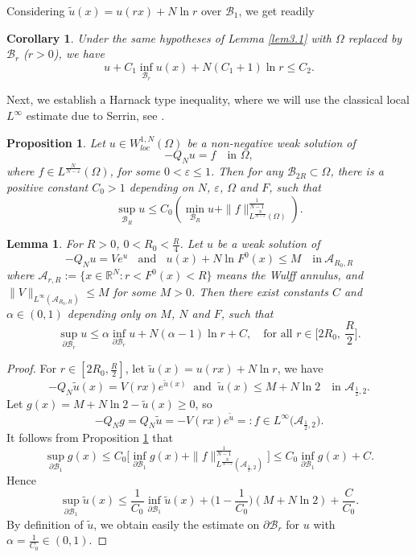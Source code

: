 \documentclass[11pt]{amsart}
\numberwithin{equation}{section}
\newtheorem{lem}[thm]{Lemma}
\newtheorem{cor}[thm]{Corollary}
\newtheorem{prop}[thm]{Proposition}
\newcommand{\A}{\mathcal{A}}
\newcommand{\B}{\mathcal{B}}
\def \p{\partial}
\begin{document}
\medskip
Considering $\widetilde{u}(x)=u(rx)+N\ln r$ over $\mathcal{B}_{1}$, we get readily
\begin{cor}\label{cor3.1}
Under the same hypotheses of Lemma \ref{lem3.1} with $\Omega$ replaced by $\mathcal{B}_r$ ($r > 0$), we have
$$u+C_{1}\inf_{\mathcal{B}_{r}}u(x)+N(C_{1}+1)\ln r\leq C_{2}.$$
\end{cor}

Next, we establish a Harnack type inequality, where we will use the classical local $L^{\infty}$ estimate due to Serrin, see \cite[Theorem 6]{S1964}.
\begin{prop}\label{pro2.2}
Let $u\in W^{1,N}_{loc}(\Omega)$ be a non-negative weak solution of
$$-Q_{N}u=f \quad\mbox{in }\Omega,$$
where $f\in L^{\frac{N}{N-\varepsilon}}(\Omega)$, for some $0<\varepsilon\leq1$. Then for any $\mathcal{B}_{2R}\subset\Omega$, there is a positive constant $C_0 > 1$ depending on $N$, $\varepsilon$, $\Omega$ and $F$, such that
$$
\sup_{\mathcal{B}_{R}}u\leq C_0\left(\min\limits_{\mathcal{B}_{R}}u+\| f\|^{\frac{1}{N-1}}_{L^{\frac{N}{N-\varepsilon}}(\Omega)}\right).
$$
\end{prop}
\begin{lem}\label{lem3.3}
For $R>0$, $0<R_{0}<\frac{R}{4}$. Let $u$ be a weak solution of
$$-Q_{N}u =Ve^{u} \;\; \mbox{ and  }\;\; u(x)+N\ln F^{0}(x) \leq M  \quad \mbox{in}~\A_{R_0, R}$$
where $\A_{r, R} :=\{x\in\mathbb{R}^{N}: r<F^{0}(x)<R\}$ means the Wulff annulus, and $\|V\|_{L^{\infty}(\A_{R_0, R})}\leq M$ for some $M > 0$. Then there exist constants $C$ and $\alpha\in(0,1)$ depending only on $M$, $N$ and $F$, such that
$$
\sup\limits_{\p\B_r}u \leq \alpha\inf\limits_{\p\B_r}u +N(\alpha-1)\ln r+C,\quad\mbox{for all } r\in \Big[2R_{0},~\frac{R}{2}\Big].
$$
\end{lem}
\begin{proof}
For $r\in[2R_{0}, \frac{R}{2}]$, let $\widetilde{u}(x)=u(rx)+N\ln r$, we have
$$
-Q_{N}\widetilde{u}(x)=V(rx)e^{\widetilde{u}(x)}\;\; \mbox{and}\;\; \widetilde{u}(x) \leq M + N\ln2 \quad\mbox{in } \A_{\frac{1}{2}, 2}.
$$
 Let $g(x)= M+N\ln2-\widetilde{u}(x)\geq0$, so
$$
-Q_{N}g =Q_{N}\widetilde{u} =-V(rx)e^{\widetilde{u}}=:f\in L^{\infty}\big(\A_{\frac{1}{2}, 2}\big).
$$
It follows from Proposition \ref{pro2.2} that
$$
\sup\limits_{\p\B_1}g(x)\leq C_0\Big[\inf\limits_{\p\B_1}g(x)+\| f\|^{\frac{1}{N-1}}_{L^{\frac{N}{N-\varepsilon}}(\A_{\frac{1}{2}, 2})}\Big] \leq C_0 \inf\limits_{\p\B_1}g(x) + C.
$$
Hence
$$\sup\limits_{\p\B_1}\widetilde{u}(x)\leq\frac{1}{C_0}\inf\limits_{\p\B_1}\widetilde{u}(x)+\Big(1-\frac{1}{C_0}\Big)(M+N\ln2)+ \frac{C}{C_0}.$$
By definition of $\widetilde u$, we obtain easily the estimate on $\p\B_r$ for $u$ with $\alpha=\frac{1}{C_0}\in (0,1).$
\end{proof}
\end{document}
